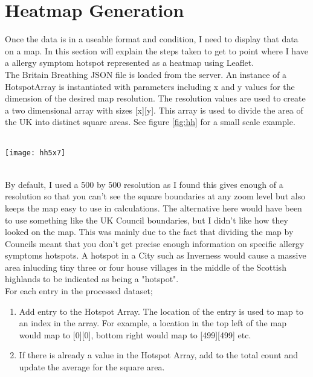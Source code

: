 \section{Heatmap Generation}

Once the data is in a useable format and condition, I need to display that data on a map. In this section will explain the steps taken to get to point where I have a allergy symptom hotspot represented as a heatmap using Leaflet.\\

The Britain Breathing JSON file is loaded from the server. An instance of a HotspotArray is instantiated with parameters including x and y values for the dimension of the desired map resolution. The resolution values are used to create a two dimensional array with sizes [x][y]. This array is used to divide the area of the UK into distinct square areas. See figure \ref{fig:hh} for a small scale example.

\begin{SCfigure}
\label{fig:hh}
\caption{Figure \ref{fig:hh} : A [5][7] resolution example}\\
\centering
\texttt{[image: hh5x7]}
\centering
\end{SCfigure}\\

By default, I used a 500 by 500 resolution as I found this gives enough of a resolution so that you can't see the square boundaries at any zoom level but also keeps the map easy to use in calculations. The alternative here would have been to use something like the UK Council boundaries, but I didn't like how they looked on the map. This was mainly due to the fact that dividing the map by Councils meant that you don't get precise enough information on specific allergy symptoms hotspots. A hotspot in a City such as Inverness would cause a massive area inlucding tiny three or four house villages in the middle of the Scottish highlands to be indicated as being a "hotspot".\\

For each entry in the processed dataset;

\begin{enumerate}
    \item Add entry to the Hotspot Array. The location of the entry is used to map to an index in the array. For example, a location in the top left of the map would map to [0][0], bottom right would map to [499][499] etc. 
    \item If there is already a value in the Hotspot Array, add to the total count and update the average for the square area.
\end{enumerate}


